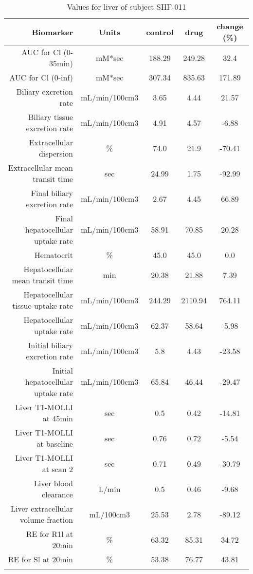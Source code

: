 \documentclass{epflreport}%
\begin{document}
%
\clearpage%
\begin{longtable}{rcccc}%
\hline%
Biomarker&Units&control&drug&change (\%)\\%
\hline%
AUC for Cl (0{-}35min)&mM*sec&188.29&249.28&32.4\\%
AUC for Cl (0{-}inf)&mM*sec&307.34&835.63&171.89\\%
Biliary excretion rate&mL/min/100cm3&3.65&4.44&21.57\\%
Biliary tissue excretion rate&mL/min/100cm3&4.91&4.57&{-}6.88\\%
Extracellular dispersion&\%&74.0&21.9&{-}70.41\\%
Extracellular mean transit time&sec&24.99&1.75&{-}92.99\\%
Final biliary excretion rate&mL/min/100cm3&2.67&4.45&66.89\\%
Final hepatocellular uptake rate&mL/min/100cm3&58.91&70.85&20.28\\%
Hematocrit&\%&45.0&45.0&0.0\\%
Hepatocellular mean transit time&min&20.38&21.88&7.39\\%
Hepatocellular tissue uptake rate&mL/min/100cm3&244.29&2110.94&764.11\\%
Hepatocellular uptake rate&mL/min/100cm3&62.37&58.64&{-}5.98\\%
Initial biliary excretion rate&mL/min/100cm3&5.8&4.43&{-}23.58\\%
Initial hepatocellular uptake rate&mL/min/100cm3&65.84&46.44&{-}29.47\\%
Liver T1{-}MOLLI at 45min&sec&0.5&0.42&{-}14.81\\%
Liver T1{-}MOLLI at baseline&sec&0.76&0.72&{-}5.54\\%
Liver T1{-}MOLLI at scan 2&sec&0.71&0.49&{-}30.79\\%
Liver blood clearance&L/min&0.5&0.46&{-}9.68\\%
Liver extracellular volume fraction&mL/100cm3&25.53&2.78&{-}89.12\\%
RE for R1l at 20min&\%&63.32&85.31&34.72\\%
RE for Sl at 20min&\%&53.38&76.77&43.81\\%
\hline%
\caption{Values for liver of subject SHF-011} \\%
\end{longtable}%
\end{document}
